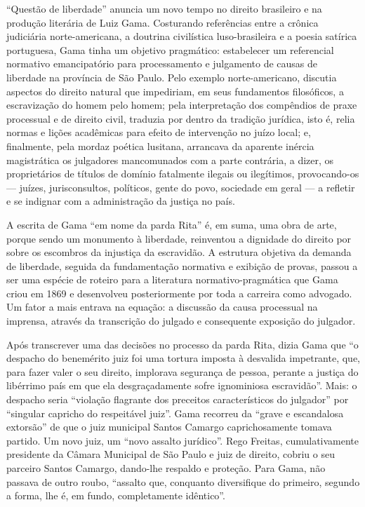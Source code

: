 ``Questão de liberdade'' anuncia um novo tempo no direito brasileiro
e na produção literária de Luiz Gama. Costurando referências entre a
crônica judiciária norte-americana, a doutrina civilística
luso-brasileira e a poesia satírica portuguesa, Gama tinha um objetivo
pragmático: estabelecer um referencial normativo emancipatório para
processamento e julgamento de causas de liberdade na província de São
Paulo. Pelo exemplo norte-americano, discutia aspectos do direito
natural que impediriam, em seus fundamentos filosóficos, a escravização
do homem pelo homem; pela interpretação dos compêndios de praxe
processual e de direito civil, traduzia por dentro da tradição jurídica,
isto é, relia normas e lições acadêmicas para efeito de intervenção no
juízo local; e, finalmente, pela mordaz poética lusitana, arrancava da
aparente inércia magistrática os julgadores mancomunados com a parte
contrária, a dizer, os proprietários de títulos de domínio fatalmente
ilegais ou ilegítimos, provocando-os --- juízes, jurisconsultos,
políticos, gente do povo, sociedade em geral --- a refletir e se indignar
com a administração da justiça no país.

A escrita de Gama ``em nome da parda Rita'' é, em suma, uma obra de arte,
porque sendo um monumento à liberdade, reinventou a dignidade do direito
por sobre os escombros da injustiça da escravidão. A estrutura objetiva
da demanda de liberdade, seguida da fundamentação normativa e exibição
de provas, passou a ser uma espécie de roteiro para a literatura
normativo-pragmática que Gama criou em 1869 e desenvolveu posteriormente
por toda a carreira como advogado. Um fator a mais entrava na equação: a
discussão da causa processual na imprensa, através da transcrição do
julgado e consequente exposição do julgador.

Após transcrever uma das decisões no processo da parda Rita, dizia Gama
que ``o despacho do benemérito juiz foi uma tortura imposta à desvalida
impetrante, que, para fazer valer o seu direito, implorava segurança de
pessoa, perante a justiça do libérrimo país em que ela desgraçadamente
sofre ignominiosa escravidão''. Mais: o despacho seria ``violação
flagrante dos preceitos característicos do julgador'' por ``singular
capricho do respeitável juiz''. Gama recorreu da ``grave e escandalosa
extorsão'' de que o juiz municipal Santos Camargo caprichosamente tomava
partido. Um novo juiz, um ``novo assalto jurídico''. Rego Freitas,
cumulativamente presidente da Câmara Municipal de São Paulo e juiz de
direito, cobriu o seu parceiro Santos Camargo, dando-lhe respaldo e
proteção. Para Gama, não passava de outro roubo, ``assalto que, conquanto
diversifique do primeiro, segundo a forma, lhe é, em fundo,
completamente idêntico''.

